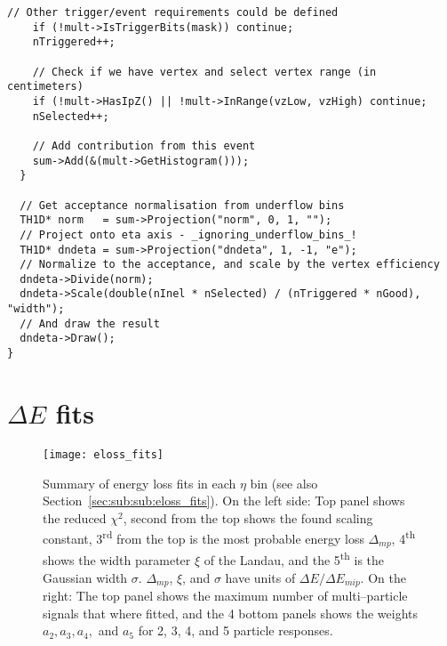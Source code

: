 \documentclass[11pt]{article}
\newcommand{\mult}[1][]{\ensuremath N_{\text{ch}#1}}
\newcommand{\dndeta}[1][]{{\ensuremath%
    \ifx|#1|\else\left.\fi%
    \frac{1}{N}\frac{d\mult{}}{d\eta}%
    \ifx|#1|\else\right|_{#1}\fi%
}}
\newcommand{\secref}[1]{Section~\ref{#1}}
\begin{document}
\begin{lstlisting}[caption={Example 2\textsuperscript{nd} pass code to
    do $\dndeta$},label={lst:example},frame=single,captionpos=b]
    // Other trigger/event requirements could be defined 
    if (!mult->IsTriggerBits(mask)) continue; 
    nTriggered++;

    // Check if we have vertex and select vertex range (in centimeters) 
    if (!mult->HasIpZ() || !mult->InRange(vzLow, vzHigh) continue; 
    nSelected++;

    // Add contribution from this event
    sum->Add(&(mult->GetHistogram()));
  }

  // Get acceptance normalisation from underflow bins 
  TH1D* norm   = sum->Projection("norm", 0, 1, "");
  // Project onto eta axis - _ignoring_underflow_bins_!
  TH1D* dndeta = sum->Projection("dndeta", 1, -1, "e");
  // Normalize to the acceptance, and scale by the vertex efficiency 
  dndeta->Divide(norm);
  dndeta->Scale(double(nInel * nSelected) / (nTriggered * nGood), "width");
  // And draw the result
  dndeta->Draw();
}
\end{lstlisting}

\section{$\Delta E$ fits} 
\label{app:eloss_fits}

\begin{figure}[htbp]
  \centering
  \texttt{[image: eloss\_fits]}
  \caption{Summary of energy loss fits in each $\eta$ bin (see also
    \secref{sec:sub:sub:eloss_fits}).
    \newline
    On the left side: Top panel shows the
    reduced $\chi^2$, second from the top shows the found
    scaling constant, 3\textsuperscript{rd} from the top is
    the most probable energy loss $\Delta_{mp}$, 4\textsuperscript{th}
    shows the width parameter $\xi$ of the Landau, and the
    5\textsuperscript{th} is the Gaussian width $\sigma$.
    $\Delta_{mp}$, $\xi$, and $\sigma$ have units of $\Delta E/\Delta
    E_{mip}$. 
    \newline
    On the right: The top panel shows the maximum number of
    multi--particle signals that where fitted, and the 4 bottom panels
    shows the weights $a_2,a_3,a_4,$ and $a_5$ for 2, 3, 4, and 5
    particle responses.}
  \label{fig:eloss_fits}
\end{figure}
\end{document}
